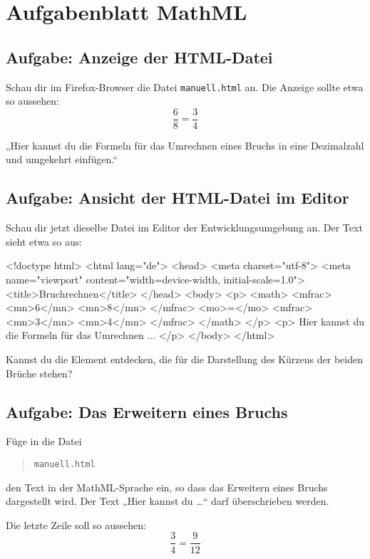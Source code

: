\section{Aufgabenblatt MathML}

\subsection*{Aufgabe: Anzeige der HTML-Datei}

Schau dir im Firefox-Browser die Datei \texttt{manuell.html} an. Die Anzeige sollte etwa so aussehen:
\[
\frac{6}{8} = \frac{3}{4}
\]

„Hier kannst du die Formeln für das Umrechnen eines Bruchs in eine Dezimalzahl und umgekehrt einfügen.“

\subsection*{Aufgabe: Ansicht der HTML-Datei im Editor}

Schau dir jetzt dieselbe Datei im Editor der Entwicklungsumgebung an. Der Text sieht etwa so aus:

\begin{codeHTML}
<!doctype html>
<html lang="de">
	<head>
		<meta charset="utf-8">
		<meta name="viewport" content="width=device-width, initial-scale=1.0">
		<title>Bruchrechnen</title>
	</head>
	<body>
		<p>
			<math>
				<mfrac>
					<mn>6</mn>
					<mn>8</mn>
				</mfrac>
				<mo>=</mo>
				<mfrac>
					<mn>3</mn>
					<mn>4</mn>
				</mfrac>
			</math>
		</p>
		<p>
 			Hier kannst du die Formeln für das Umrechnen ...
		</p>
	</body>
</html>
\end{codeHTML}

Kannst du die Element entdecken, die für die Darstellung des Kürzens der beiden Brüche stehen?

\subsection*{Aufgabe: Das Erweitern eines Bruchs}

Füge in die Datei
\begin{quote}
\texttt{manuell.html}
\end{quote}
den Text in der MathML-Sprache ein, so dass das Erweitern eines Bruchs dargestellt wird. Der Text „Hier kannst du \dots“ darf überschrieben werden.

Die letzte Zeile soll so aussehen:
\[
\frac{3}{4} = \frac{9}{12}
\]

